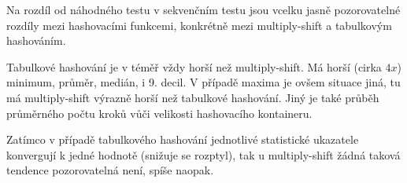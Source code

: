 \documentclass[12pt,a4paper]{report}
\begin{document}
	\begin{figure}[h]	
		\centering
		\qquad
	\end{figure}
	
	Na rozdíl od náhodného testu v sekvenčním testu jsou vcelku jasně pozorovatelné rozdíly mezi hashovacími funkcemi, konkrétně mezi multiply-shift a tabulkovým hashováním.
	
	Tabulkové hashování je v téměř vždy horší než multiply-shift. Má horší (cirka $4x$) minimum, průměr, medián, i 9. decil. V případě maxima je ovšem situace jiná, tu má multiply-shift výrazně horší než tabulkové hashování. Jiný je také průběh průměrného počtu kroků vůči velikosti hashovacího kontaineru. 
	
	Zatímco v případě tabulkového hashování jednotlivé statistické ukazatele konvergují k jedné hodnotě (snižuje se rozptyl), tak u multiply-shift žádná taková tendence pozorovatelná není, spíše naopak.
	
\end{document}
